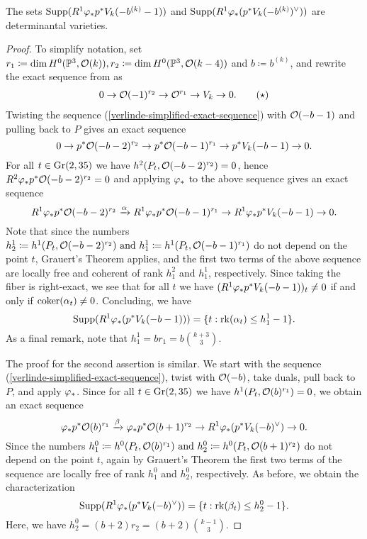 \begin{proposition} \label{supp-are-det-varieties}
The sets
$\operatorname{Supp}(R^1 \varphi_{*}p^{*} V_{k}(-b^{(k)}-1))$ and
$\operatorname{Supp}(R^1 \varphi_{*}(p^{*} V_{k}(-b^{(k)})^\vee))$ 
are determinantal varieties.
\end{proposition}
\begin{proof}
To simplify notation, set
$r_1 \coloneqq \dim H^0(\mathbb{P}^3, \mathcal{O}(k)),
r_2 \coloneqq \dim H^0(\mathbb{P}^3, \mathcal{O}(k-4))$ and $b\coloneqq b^{(k)}$,
and rewrite the exact sequence from  as
\begin{align} \label{verlinde-simplified-exact-sequence}
0 \to \mathcal{O}(-1)^{r_2} \to \mathcal{O}^{r_1} \to V_k \to 0. \tag{$\star$}
\end{align}
Twisting the sequence (\ref{verlinde-simplified-exact-sequence}) with $\mathcal{O}(-b-1)$ and pulling back to $P$ gives an exact sequence
\[
0
\to  {p^{*}\mathcal{O}(-b-2)^{r_2}}
\to  {p^{*}\mathcal{O}(-b-1)^{r_1}}
\to  {p^{*}V_k(-b-1)}
\to  0.
\]
For all $t\in \operatorname{Gr}(2,35)$ we have
$h^2(P_t, \mathcal{O}(-b-2)^{r_2}) = 0$,
hence
$R^2\varphi_{*}p^{*}\mathcal{O}(-b-2)^{r_2} = 0$
and applying $\varphi_{*}$ to the above sequence gives an exact sequence
\[
R^1\varphi_{*}p^{*}\mathcal{O}(-b-2)^{r_2}
\xrightarrow{\alpha}
R^1\varphi_{*}p^{*}\mathcal{O}(-b-1)^{r_1} 
\to
R^1\varphi_{*}p^{*} V_k(-b-1)
\to 0.
\]
Note that since the numbers
$
h^{1}_{2}\coloneqq h^1(P_t, \mathcal{O}(-b-2)^{r_2})
\text{ and }
h_{1}^{1}\coloneqq h^1(P_t, \mathcal{O}(-b-1)^{r_1})
$
do not depend on the point $t$, Grauert's Theorem applies, and the first two terms of the above sequence are locally free and coherent of rank $h_1^2$ and $h_1^1$, respectively. Since taking the fiber is right-exact, we see that for all $t$ we have
$(R^1\varphi_{*}p^{*} V_k(-b-1))_t \neq 0$ if and only if $\operatorname{coker}(\alpha_t) \neq 0$. Concluding, we have
\[
\operatorname{Supp}(R^1\varphi_{*}(p^{*} V_k(-b-1)))
= \{t : \operatorname{rk} (\alpha_t)\leq h^{1}_1 - 1\}.
\]
As a final remark, note that $h^1_1 = b r_1 = b \binom{k+3}{3}.$

The proof for the second assertion is similar. We start with the sequence (\ref{verlinde-simplified-exact-sequence}), twist with $\mathcal{O}(-b)$, take duals, pull back to $P$, and apply $\varphi_{*}$. Since for all $t\in \operatorname{Gr}(2,35)$ we have $h^1(P_t, \mathcal{O}(b)^{r_1})=0$, we obtain an exact sequence
\[
	{\varphi_{*}p^{*}\mathcal{O}(b)^{r_1} }
\xrightarrow{\beta}	{\varphi_{*}p^{*}\mathcal{O}(b+1)^{r_2}}
\to	{R^1 \varphi_{*}(p^{*} V_{k}(-b)^\vee)}
\to 0.
\]
Since the numbers
$
h^0_1 \coloneqq h^0(P_t,\mathcal{O}(b)^{r_1}) \text{ and }
h^0_2 \coloneqq h^0(P_t, \mathcal{O}(b+1)^{r_2})
$
do not depend on the point $t$, again by Grauert's Theorem the first two terms of the sequence are locally free of rank $h^0_1$ and $h^0_2$, respectively. As before, we obtain the characterization
\[
	\operatorname{Supp}(R^1 \varphi_{*}(p^{*} V_{k}(-b)^\vee))
	= \{t : \operatorname{rk} (\beta_t)\leq h^{0}_2 - 1\}.
\]
Here, we have $h_2^0 = (b+2)r_2 = (b+2)\binom{k-1}{3}.$
\end{proof}


